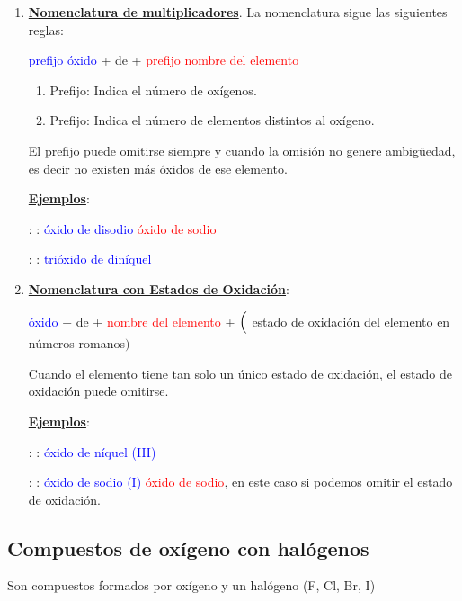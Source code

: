 \documentclass[12pt]{article}
\begin{document}
\begin{enumerate}[label=\itembolascolor{\arabic*}{blue}]
    \item \textbf{\uline{Nomenclatura de multiplicadores}}. La nomenclatura sigue las siguientes reglas:
          \begin{center}
              \textcolor{blue}{prefijo} \textcolor{blue}{óxido} + de + \textcolor{red}{prefijo} \textcolor{red}{nombre del elemento}
          \end{center}

          \begin{enumerate}[label=\textcolor{red}{$\bullet$}]
              \item Prefijo: Indica el número de oxígenos.
              \item Prefijo: Indica el número de elementos distintos al oxígeno.
          \end{enumerate}

          El prefijo  puede omitirse siempre y cuando la omisión no genere ambigüedad, es decir no existen más óxidos de ese elemento.

          \textbf{\uline{Ejemplos}}:

           : : \textcolor{blue}{óxido de disodio} \ch{->} \textcolor{red}{óxido de sodio}

           : : \textcolor{blue}{trióxido de diníquel}

    \item \textbf{\uline{Nomenclatura con Estados de Oxidación}}:
          \begin{center}
              \textcolor{blue}{óxido} + de + \textcolor{red}{nombre del elemento} + $\Bigl($ \textcolor{green!50!black}{estado de oxidación del elemento en números romanos}$\Bigr)$
          \end{center}
          Cuando el elemento tiene tan solo un único estado de oxidación, el estado de oxidación puede omitirse.

          \textbf{\uline{Ejemplos}}:

           : : \textcolor{blue}{óxido de níquel (III)}

           : : \textcolor{blue}{óxido de sodio (I)} \ch{->} \textcolor{red}{óxido de sodio}, en este caso si podemos omitir el estado de oxidación.
\end{enumerate}


\subsection{Compuestos de oxígeno con halógenos}
Son compuestos formados por oxígeno y un halógeno (F, Cl, Br, I)
\end{document}
